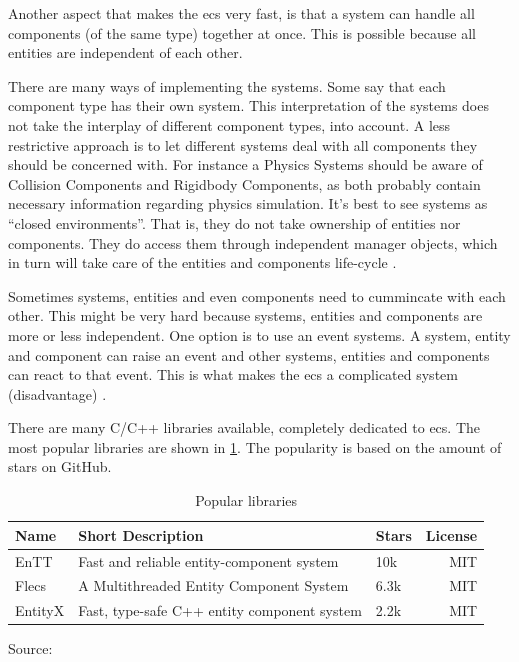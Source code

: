 \documentclass{projdoc}
\begin{document}
Another aspect that makes the \gls{ecs} very fast, is that a system can handle all
components (of the same type) together at once. This is possible because all entities
are independent of each other.

There are many ways of implementing the systems. Some say that each component type
has their own system. This interpretation of the systems does not take the interplay
of different component types, into account. A less restrictive approach is to let
different systems deal with all components they should be concerned with. For
instance a Physics Systems should be aware of Collision Components and Rigidbody
Components, as both probably contain necessary information regarding physics
simulation. It's best to see systems as ``closed environments''. That is, they do not
take ownership of entities nor components. They do access them through independent
manager objects, which in turn will take care of the entities and components
life-cycle \autocite{man:ECSExplanation}.

Sometimes systems, entities and even components need to cummincate with each other.
This might be very hard because systems, entities and components are more or less
independent. One option is to use an event systems. A system, entity and component
can raise an event and other systems, entities and components can react to that
event. This is what makes the \gls{ecs} a complicated system (disadvantage)
\autocite{man:ECSExplanation}.

There are many C/C++ libraries available, completely dedicated to \gls{ecs}. The most
popular libraries are shown in \cref{tab:popularECSLibraries}. The popularity is
based on the amount of stars on GitHub.

\begin{table}
	\centering
	\begin{tabular}{ll@{\qquad}lr}
		\toprule
		\textbf{Name} & \textbf{Short Description} & \textbf{Stars} & \textbf{License}\\
		\midrule
		EnTT & Fast and reliable entity-component system & 10k & MIT\\
		Flecs & A Multithreaded Entity Component System & 6.3k & MIT\\
		EntityX & Fast, type-safe C++ entity component system & 2.2k & MIT\\
		\bottomrule
	\end{tabular}
	\caption{Popular  libraries}
	Source: \autocite{github:awesome-ecs}
	\label{tab:popularECSLibraries}
\end{table}
\end{document}
